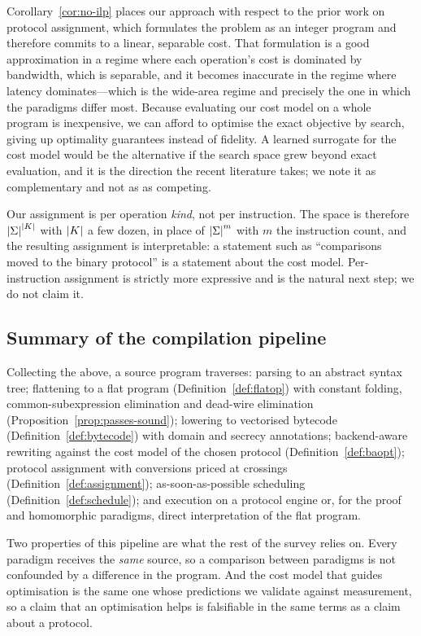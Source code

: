 Corollary~\ref{cor:no-ilp} places our approach with respect to the prior work on
protocol assignment, which formulates the problem as an integer program and
therefore commits to a linear, separable cost. That formulation is a good
approximation in a regime where each operation's cost is dominated by bandwidth,
which is separable, and it becomes inaccurate in the regime where latency
dominates---which is the wide-area regime and precisely the one in which the
paradigms differ most. Because evaluating our cost model on a whole program is
inexpensive, we can afford to optimise the exact objective by search, giving up
optimality guarantees instead of fidelity. A learned surrogate for the cost model
would be the alternative if the search space grew beyond exact evaluation, and it
is the direction the recent literature takes; we note it as complementary and not as as competing.

\begin{remark}
\label{rem:assign-scope}
Our assignment is per operation \emph{kind}, not per instruction. The space is
therefore $\left\lvert \Sigma \right\rvert^{\left\lvert K \right\rvert}$ with $\left\lvert K \right\rvert$ a few dozen, in place of
$\left\lvert \Sigma \right\rvert^{m}$ with $m$ the instruction count, and the resulting assignment is
interpretable: a statement such as ``comparisons moved to the binary protocol'' is
a statement about the cost model. Per-instruction assignment is strictly more
expressive and is the natural next step; we do not claim it.
\end{remark}

\subsection{Summary of the compilation pipeline}
\label{sec:compiler:summary}

Collecting the above, a source program traverses: parsing to an abstract syntax
tree; flattening to a flat program (Definition~\ref{def:flatop}) with constant
folding, common-subexpression elimination and dead-wire elimination
(Proposition~\ref{prop:passes-sound}); lowering to vectorised bytecode
(Definition~\ref{def:bytecode}) with domain and secrecy annotations; backend-aware
rewriting against the cost model of the chosen protocol
(Definition~\ref{def:baopt}); protocol assignment with conversions priced at
crossings (Definition~\ref{def:assignment}); as-soon-as-possible scheduling
(Definition~\ref{def:schedule}); and execution on a protocol engine or, for the
proof and homomorphic paradigms, direct interpretation of the flat program.

Two properties of this pipeline are what the rest of the survey relies on. Every
paradigm receives the \emph{same} source, so a comparison between paradigms is not
confounded by a difference in the program. And the cost model that guides
optimisation is the same one whose predictions we validate against measurement,
so a claim that an optimisation helps is falsifiable in the same terms as a claim
about a protocol.
